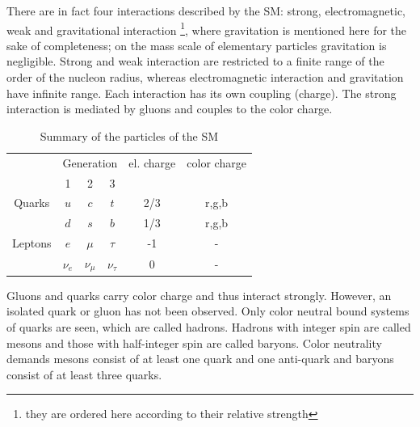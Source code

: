 There are in fact four interactions described by the SM: strong, electromagnetic, weak and gravitational interaction \footnote{they are ordered here according to their relative strength}, where gravitation is mentioned here for the sake of completeness; on the mass scale of elementary particles gravitation is negligible. Strong and weak interaction are restricted to a finite range of the order of the nucleon radius, whereas electromagnetic interaction and gravitation have infinite range. Each interaction has its own coupling (charge). The strong interaction is mediated by gluons and couples to the color charge.%
\begin{table}[htbp]
	\centering
	\begin{tabular}{cccccc}
		\toprule
		&\multicolumn{3}{c}{Generation}&el. charge&color charge\\
		&1 & 2 & 3 & & \\
		\hline
		Quarks & $u$&$c$&$t$& 2/3 & r,g,b\\
		&$d$&$s$&$b$& 1/3 & r,g,b\\
		Leptons& $e$&$\mu$&$\tau$&-1& -\\
		& $\nu_e$&$\nu_\mu$&$\nu_\tau$&0&-\\
		\bottomrule

	\end{tabular}
\caption{Summary of the particles of the SM}
\label{tab:sm0}
\end{table}
%



Gluons and quarks carry color charge and thus interact strongly. However, an isolated quark or gluon has not been observed. Only color neutral bound systems of quarks are seen, which are called hadrons. Hadrons with integer spin are called mesons and those with half-integer spin are called baryons. Color neutrality demands mesons consist of at least one quark and one anti-quark and baryons consist of at least three quarks.


